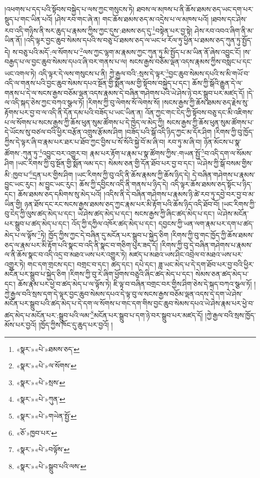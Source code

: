 །འཕགས་པ་དད་པའི་སྟོབས་བསྐྱེད་པ་ལས་ཀྱང་གསུངས་ཏེ། ཐབས་ལ་མཁས་པ་ནི་ཆོས་ཐམས་ཅད་ཡང་དག་པར་སྡུད་པ་གང་ཡིན་པའོ། །ཤེས་རབ་གང་ཞེ་ན། གང་ཆོས་ཐམས་ཅད་མ་འདྲེས་པ་ལ་མཁས་པའོ། །ཐབས་དང་ཤེས་རབ་འདི་གཉིས་ནི་སར་ཆུད་པ་རྣམས་ཀྱིས་ཀྱང་དུས་:ཐམས་ཅད་དུ་\footnote{«སྣར་»«པེ་»ཐམས་ཅད་}བསྟེན་པར་བྱ་སྟེ། ཤེས་རབ་འབའ་ཞིག་ནི་མ་ཡིན་ནོ། །འདི་ལྟར་བྱང་ཆུབ་སེམས་དཔའི་ས་བཅུ་པོ་ཐམས་ཅད་ལ་ཡང་ཕ་རོལ་ཏུ་ཕྱིན་པ་ཐམས་ཅད་ཀུན་ཏུ་སྤྱོད་དེ། ས་བཅུ་པའི་མདོ་:ལ་སོགས་པ་\footnote{«སྣར་»«པེ་»ལ་སོགས་}ལས་ཀྱང་ལྷག་མ་རྣམས་ཀྱང་ཀུན་ཏུ་མི་སྤྱོད་པ་མ་ཡིན་ནོ་ཞེས་འབྱུང་ངོ། །ས་བརྒྱད་པ་ལ་བྱང་ཆུབ་སེམས་དཔའ་ཞི་བར་གནས་པ་ལ། སངས་རྒྱས་བཅོམ་ལྡན་འདས་རྣམས་ཀྱིས་བསླང་པ་དང་ཡང་འགལ་ཏེ། འདི་ལྟར་དེ་ལས་གསུངས་པ་ནི། ཀྱེ་རྒྱལ་བའི་:སྲས་དེ་ལྟར་\footnote{«སྣར་»«པེ་»སྲས་}བྱང་ཆུབ་སེམས་དཔའི་ས་མི་གཡོ་བ་འདི་ལ་གནས་པའི་བྱང་ཆུབ་སེམས་དཔའ་སྔོན་གྱི་སྨོན་ལམ་གྱི་སྟོབས་བསྐྱེད་པ་དང་། ཆོས་ཀྱི་སྒོའི་རྒྱུན་དེ་ལ་གནས་པ་དེ་ལ་སངས་རྒྱས་བཅོམ་ལྡན་འདས་རྣམས་དེ་བཞིན་གཤེགས་པའི་ཡེ་ཤེས་ཉེ་བར་སྒྲུབ་པར་མཛད་དོ། །དེ་ལ་འདི་སྐད་ཅེས་ཀྱང་བཀའ་སྩལ་ཏོ། །རིགས་ཀྱི་བུ་ལེགས་སོ་ལེགས་སོ། །སངས་རྒྱས་ཀྱི་ཆོས་ཐམས་ཅད་རྗེས་སུ་རྟོགས་པར་བྱ་བ་ལ་འདི་ནི་དོན་དམ་པའི་བཟོད་པ་ཡང་ཡིན་ན། འོན་ཀྱང་གང་ངེད་ཀྱི་སྟོབས་བཅུ་དང་མི་འཇིགས་པ་ལ་སོགས་པ་སངས་རྒྱས་ཀྱི་ཆོས་ཕུན་སུམ་ཚོགས་པ་དེ་ཁྱེད་ལ་མེད་ཀྱི། སངས་རྒྱས་ཀྱི་ཆོས་ཕུན་སུམ་ཚོགས་པ་དེ་ཡོངས་སུ་བཙལ་བའི་ཕྱིར་བརྩོན་འགྲུས་རྩོམས་ཤིག །བཟོད་པའི་སྒོ་འདི་ཉིད་ཀྱང་མ་དོར་ཤིག །རིགས་ཀྱི་བུ་ཁྱོད་ཀྱིས་དེ་ལྟར་ཞི་བ་རྣམ་པར་ཐར་པ་ཐོབ་ཀྱང་བྱིས་པ་སོ་སོའི་སྐྱེ་བོ་མ་ཞི་བ། རབ་ཏུ་མ་ཞི་བ། ཉོན་མོངས་པ་སྣ་ཚོགས་:ཀུན་ཏུ་\footnote{«སྣར་»«པེ་»ཀུན་}འབྱུང་བར་འགྱུར་བ། རྣམ་པར་རྟོག་པ་རྣམ་པ་སྣ་ཚོགས་ཀྱིས་:གཡན་སྤྱོ་\footnote{«སྣར་»«པེ་»གཡེན་སྤྱོ་}བ་འདི་དག་ལ་སོམས་ཤིག །ཡང་རིགས་ཀྱི་བུ་སྔོན་གྱི་སྨོན་ལམ་དང་། སེམས་ཅན་གྱི་དོན་ཐོབ་པར་བྱ་བ་དང་། ཡེ་ཤེས་ཀྱི་སྒོ་བསམ་གྱིས་མི་:ཁྱབ་པ་\footnote{«ཅོ་»ཁྱབ་པར་}དྲན་པར་གྱིས་ཤིག །ཡང་རིགས་ཀྱི་བུ་འདི་ནི་ཆོས་རྣམས་ཀྱི་ཆོས་ཉིད་དེ། དེ་བཞིན་གཤེགས་པ་རྣམས་བྱུང་ཡང་རུང་། མ་བྱུང་ཡང་རུང་། ཆོས་ཀྱི་དབྱིངས་འདི་ནི་གནས་པ་ཉིད་དེ། འདི་ལྟར་ཆོས་ཐམས་ཅད་སྟོང་པ་ཉིད་དང་། ཆོས་ཐམས་ཅད་དམིགས་སུ་མེད་པའོ། །འདིས་ནི་དེ་བཞིན་གཤེགས་པ་རྣམས་ཉི་ཚེ་རབ་ཏུ་དབྱེ་བར་བྱ་བ་མ་ཡིན་གྱི། ཉན་ཐོས་དང་རང་སངས་རྒྱས་ཐམས་ཅད་ཀྱང་རྣམ་པར་མི་རྟོག་པའི་ཆོས་ཉིད་འདི་ཐོབ་བོ། །ཡང་རིགས་ཀྱི་བུ་ངེད་ཀྱི་ལུས་ཚད་མེད་པ་དང་། ཡེ་ཤེས་ཚད་མེད་པ་དང་། སངས་རྒྱས་ཀྱི་ཞིང་ཚད་མེད་པ་དང་། ཡེ་ཤེས་མངོན་པར་སྒྲུབ་པ་ཚད་མེད་པ་དང་། འོད་ཀྱི་དཀྱིལ་འཁོར་ཚད་མེད་པ་དང་། དབྱངས་ཀྱི་ཡན་ལག་རྣམ་པར་དག་པ་ཚད་མེད་པ་ལ་ལྟོས་\footnote{«སྣར་»«པེ་»བལྟོས་}ཏེ། ཁྱོད་ཀྱིས་ཀྱང་དེ་བཞིན་དུ་མངོན་པར་སྒྲུབ་པ་སྐྱེད་ཅིག །རིགས་ཀྱི་བུ་གང་ཁྱོད་ཀྱི་ཆོས་ཐམས་ཅད་ལ་རྣམ་པར་མི་རྟོག་པའི་སྣང་བ་འདི་ནི་སྣང་བ་གཅིག་པུར་ཟད་དོ། །རིགས་ཀྱི་བུ་དེ་བཞིན་གཤེགས་པ་རྣམས་ལ་ནི་ཆོས་སྣང་བ་འདི་འདྲ་བ་མཐའ་ཡས་པར་འགྱུར་ཏེ། མཛད་པ་མཐའ་ཡས་ཤིང་འབྲེལ་བ་མཐའ་ཡས་པར་འགྱུར་ཏེ། གང་དག་གྲངས་དང་། བགྲང་བ་དང་། ཚད་དང་། དཔེ་དང་། ཟླ་ཡང་མེད་པ་དེ་དག་ཐོབ་པར་བྱ་བའི་ཕྱིར་མངོན་པར་སྒྲུབ་པ་སྐྱེད་ཅིག །རིགས་ཀྱི་བུ་རེ་ཞིག་ཕྱོགས་བཅུའི་ཞིང་ཚད་མེད་པ་དང་། སེམས་ཅན་ཚད་མེད་པ་དང་། ཆོས་རྣམ་པར་ཕྱེ་བ་ཚད་མེད་པ་ལ་ལྟོས་ཏེ། ཇི་ལྟ་བ་བཞིན་བགྲང་བར་གྱིས་ཤིག་ཅེས་དེ་སྐད་བཀའ་སྩལ་ཏོ། །ཀྱེ་རྒྱལ་བའི་སྲས་དག་དེ་ལྟར་བྱང་ཆུབ་སེམས་དཔའ་དེ་ལྟ་བུ་ལ་སངས་རྒྱས་བཅོམ་ལྡན་འདས་དེ་དག་ཡེ་ཤེས་མངོན་པར་སྒྲུབ་པའི་ཚད་མེད་པ་དེ་དག་ལ་སོགས་པ་གང་དག་གིས་བྱང་ཆུབ་སེམས་དཔའ་ཡེ་ཤེས་རྣམ་པར་ཕྱེ་བ་ཚད་མེད་པ་མངོན་པར་:སྒྲུབ་པའི་ལམ་\footnote{«སྣར་»«པེ་»སྒྲུབ་པའི་ལས་}མངོན་པར་སྒྲུབ་པ་དག་ཉེ་བར་སྒྲུབ་པར་མཛད་དོ། །ཀྱེ་རྒྱལ་བའི་སྲས་ཁྱོད་མོས་པར་བྱའོ། །ཁྱོད་ཀྱིས་ཁོང་དུ་ཆུད་པར་བྱའོ། །
